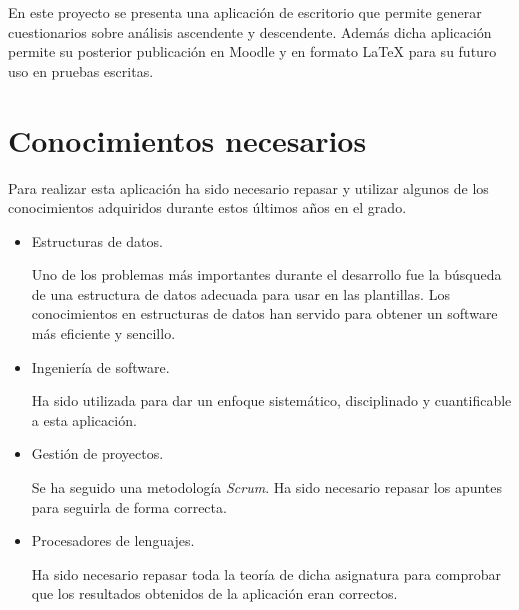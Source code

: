 En este proyecto se presenta una aplicación de escritorio que permite generar cuestionarios sobre análisis ascendente y descendente. Además dicha aplicación permite su posterior publicación en Moodle y en formato \LaTeX{} para su futuro uso en pruebas escritas.


\section{Conocimientos necesarios}
Para realizar esta aplicación ha sido necesario repasar y utilizar algunos de los conocimientos adquiridos durante estos últimos años en el grado.


\begin{itemize}
\item Estructuras de datos.

Uno de los problemas más importantes durante el desarrollo fue la búsqueda de una estructura de datos adecuada para usar en las plantillas. Los conocimientos en estructuras de datos han servido para obtener un software más eficiente y sencillo.
\item Ingeniería de software.

Ha sido utilizada para dar un enfoque sistemático, disciplinado y cuantificable a esta aplicación.

\item Gestión de proyectos.

Se ha seguido una metodología \textit{Scrum}. Ha sido necesario repasar los apuntes para seguirla de forma correcta.

\item Procesadores de lenguajes.

Ha sido necesario repasar toda la teoría de dicha asignatura para comprobar que los resultados obtenidos de la aplicación eran correctos.

\end{itemize}  
